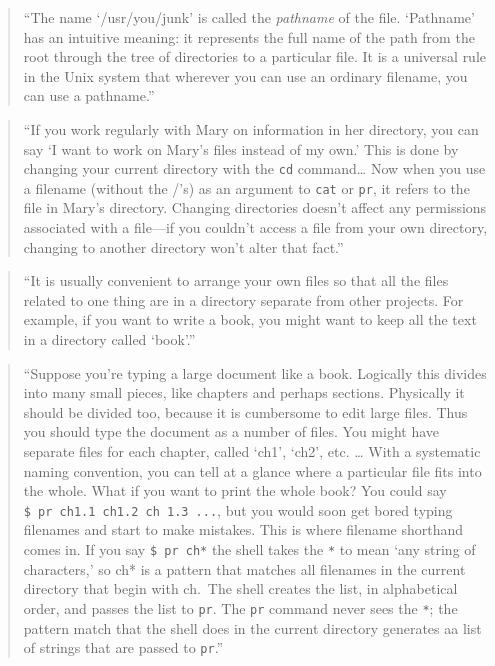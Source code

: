 \documentclass[]{tufte-book}
\begin{document}
\begin{quote}
``The name `/usr/you/junk' is called the \emph{pathname} of the file. `Pathname' has an intuitive meaning:
it represents the full name of the path from the root through the tree of directories to a particular
file. It is a universal rule in the Unix system that wherever you can use an ordinary filename, you can
use a pathname.'' \citep{kernighan1984unix}
\end{quote}

\begin{quote}
``If you work regularly with Mary on information in her directory, you can say `I want to work on Mary's
files instead of my own.' This is done by changing your current directory with the \texttt{cd} command\ldots{}
Now when you use a filename (without the /'s) as an argument to \texttt{cat} or \texttt{pr}, it refers to the file
in Mary's directory. Changing directories doesn't affect any permissions associated with a file---if you
couldn't access a file from your own directory, changing to another directory won't alter that fact.'' \citep{kernighan1984unix}
\end{quote}

\begin{quote}
``It is usually convenient to arrange your own files so that all the files related to one thing are in a
directory separate from other projects. For example, if you want to write a book, you might want to
keep all the text in a directory called `book'.'' \citep{kernighan1984unix}
\end{quote}

\begin{quote}
``Suppose you're typing a large document like a book. Logically this divides into many small pieces,
like chapters and perhaps sections. Physically it should be divided too, because it is cumbersome
to edit large files. Thus you should type the document as a number of files. You might have separate
files for each chapter, called `ch1', `ch2', etc. \ldots{} With a systematic naming convention, you can tell at
a glance where a particular file fits into the whole. What if you want to print the whole book? You could
say \texttt{\$\ pr\ ch1.1\ ch1.2\ ch\ 1.3\ ...}, but you would soon get bored typing filenames and start to make mistakes.
This is where filename shorthand comes in. If you say \texttt{\$\ pr\ ch*} the shell takes the \texttt{*} to mean `any
string of characters,' so ch* is a pattern that matches all filenames in the current directory that
begin with ch.~The shell creates the list, in alphabetical order, and passes the list to \texttt{pr}. The
\texttt{pr} command never sees the \texttt{*}; the pattern match that the shell does in the current directory
generates aa list of strings that are passed to \texttt{pr}.'' \citep{kernighan1984unix}
\end{quote}
\end{document}
